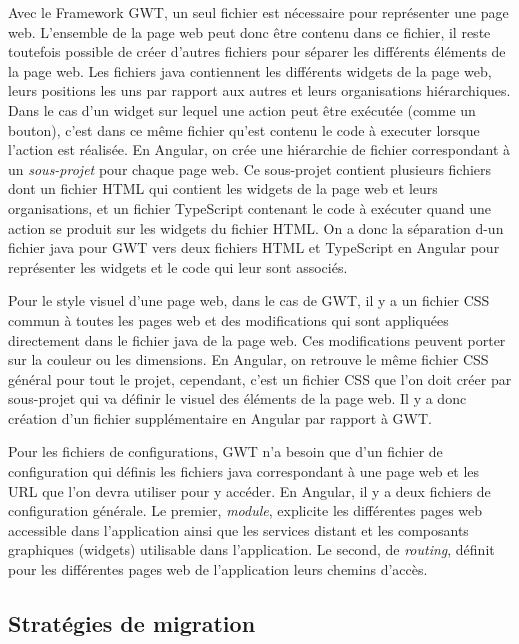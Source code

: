 \documentclass[11pt,]{article}
\begin{document}
Avec le Framework GWT, un seul fichier est nécessaire pour représenter
une page web. L'ensemble de la page web peut donc être contenu dans ce
fichier, il reste toutefois possible de créer d'autres fichiers pour
séparer les différents éléments de la page web. Les fichiers java
contiennent les différents widgets de la page web, leurs positions les
uns par rapport aux autres et leurs organisations hiérarchiques. Dans le
cas d'un widget sur lequel une action peut être exécutée (comme un
bouton), c'est dans ce même fichier qu'est contenu le code à executer
lorsque l'action est réalisée. En Angular, on crée une hiérarchie de
fichier correspondant à un \emph{sous-projet} pour chaque page web. Ce
sous-projet contient plusieurs fichiers dont un fichier HTML qui
contient les widgets de la page web et leurs organisations, et un
fichier TypeScript contenant le code à exécuter quand une action se
produit sur les widgets du fichier HTML. On a donc la séparation d-un
fichier java pour GWT vers deux fichiers HTML et TypeScript en Angular
pour représenter les widgets et le code qui leur sont associés.

Pour le style visuel d'une page web, dans le cas de GWT, il y a un
fichier CSS commun à toutes les pages web et des modifications qui sont
appliquées directement dans le fichier java de la page web. Ces
modifications peuvent porter sur la couleur ou les dimensions. En
Angular, on retrouve le même fichier CSS général pour tout le projet,
cependant, c'est un fichier CSS que l'on doit créer par sous-projet qui
va définir le visuel des éléments de la page web. Il y a donc création
d'un fichier supplémentaire en Angular par rapport à GWT.

Pour les fichiers de configurations, GWT n'a besoin que d'un fichier de
configuration qui définis les fichiers java correspondant à une page web
et les URL que l'on devra utiliser pour y accéder. En Angular, il y a
deux fichiers de configuration générale. Le premier, \emph{module},
explicite les différentes pages web accessible dans l'application ainsi
que les services distant et les composants graphiques (widgets)
utilisable dans l'application. Le second, de \emph{routing}, définit
pour les différentes pages web de l'application leurs chemins d'accès.

\hypertarget{sec:strategieMigration}{%
\subsection{Stratégies de migration}\label{sec:strategieMigration}}
\end{document}

